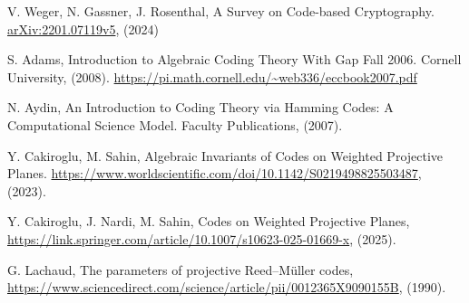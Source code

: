 \begin{thebibliography}{20}

  V. Weger, N. Gassner, J. Rosenthal, A Survey on Code-based Cryptography. \url{arXiv:2201.07119v5}, (2024)

  S. Adams, Introduction to Algebraic Coding Theory With Gap Fall 2006. Cornell University, (2008). \url{https://pi.math.cornell.edu/~web336/eccbook2007.pdf}

  N. Aydin, An Introduction to Coding Theory via Hamming Codes: A
Computational Science Model. Faculty Publications, (2007).

  Y. Cakiroglu, M. Sahin, Algebraic Invariants of Codes on Weighted Projective Planes. \url{https://www.worldscientific.com/doi/10.1142/S0219498825503487}, (2023).

  Y. Cakiroglu, J. Nardi, M. Sahin, Codes on Weighted Projective Planes, \url{https://link.springer.com/article/10.1007/s10623-025-01669-x}, (2025).

  G. Lachaud, The parameters of projective Reed–Müller codes, \url{https://www.sciencedirect.com/science/article/pii/0012365X9090155B}, (1990).

\end{thebibliography}